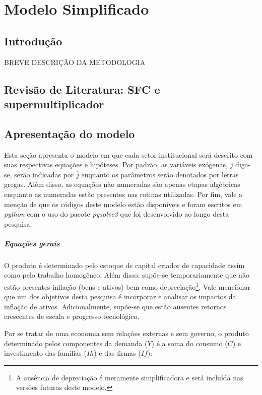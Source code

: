 \chapter{Modelo Simplificado}\label{CapModeloSimples}

\section{Introdução}

BREVE DESCRIÇÃO DA METODOLOGIA

\section{Revisão de Literatura: SFC e supermultiplicador}

\section{Apresentação do modelo}

Esta seção apresenta o modelo em que cada setor institucional será descrito com suas respectivas equações e hipóteses. Por padrão, as variáveis exógenas, $j$ diga-se, serão indicadas por $\overline j$ enquanto os parâmetros serão denotados por letras gregas. Além disso, as equações não numeradas são apenas etapas algébricas enquanto as numeradas estão presentes nas rotinas utilizadas. Por fim, vale a menção de que os códigos deste modelo estão disponíveis e foram escritos em \textit{python} com o uso do pacote \textit{pysolve3} que foi desenvolvido ao longo desta pesquisa. 

\paragraph*{Equações gerais} O produto é determinado pelo estoque de capital criador de capacidade assim como pelo trabalho homogêneo. Além disso, supõe-se temporariamente que não estão presentes inflação (bens e ativos) bem como depreciação\footnote{A ausência de depreciação é meramente simplificadora e será incluída nas versões futuras deste modelo.}. Vale mencionar que um dos objetivos desta pesquisa é incorporar e analisar os impactos da inflação de ativos. Adicionalmente, supõe-se que estão ausentes retornos crescentes de escala e progresso tecnológico.

Por se tratar de uma economia sem relações externas e sem governo, o produto determinado pelos componentes da demanda ($Y$) é a soma do consumo ($C$) e investimento das famílias ($Ih$) e das firmas ($If$):

